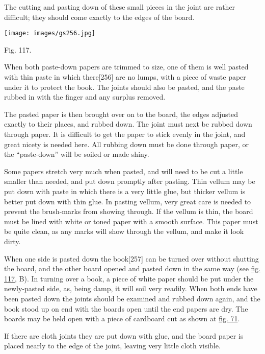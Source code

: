 \documentclass[
]{article}
\begin{document}
The cutting and pasting down of these small pieces in the joint are
rather difficult; they should come exactly to the edges of the board.

\protect\hypertarget{Fig_117}{}{}
\texttt{[image: images/gs256.jpg]}

Fig. 117.

When both paste-down papers are trimmed to size, one of them is well
pasted with thin paste in which
there{\protect\hypertarget{Page_256}{}{{[}256{]}}} are no lumps, with a
piece of waste paper under it to protect the book. The joints should
also be pasted, and the paste rubbed in with the finger and any surplus
removed.

The pasted paper is then brought over on to the board, the edges
adjusted exactly to their places, and rubbed down. The joint must next
be rubbed down through paper. It is difficult to get the paper to stick
evenly in the joint, and great nicety is needed here. All rubbing down
must be done through paper, or the ``paste-down'' will be soiled or made
shiny.

Some papers stretch very much when pasted, and will need to be cut a
little smaller than needed, and put down promptly after pasting. Thin
vellum may be put down with paste in which there is a very little glue,
but thicker vellum is better put down with thin glue. In pasting vellum,
very great care is needed to prevent the brush-marks from showing
through. If the vellum is thin, the board must be lined with white or
toned paper with a smooth surface. This paper must be quite clean, as
any marks will show through the vellum, and make it look dirty.

When one side is pasted down the
book{\protect\hypertarget{Page_257}{}{{[}257{]}}} can be turned over
without shutting the board, and the other board opened and pasted down
in the same way (see \protect\hyperlink{Fig_117}{fig. 117}, B). In
turning over a book, a piece of white paper should be put under the
newly-pasted side, as, being damp, it will soil very readily. When both
ends have been pasted down the joints should be examined and rubbed down
again, and the book stood up on end with the boards open until the end
papers are dry. The boards may be held open with a piece of cardboard
cut as shown at \protect\hyperlink{Fig_71}{fig. 71}.

If there are cloth joints they are put down with glue, and the board
paper is placed nearly to the edge of the joint, leaving very little
cloth visible.
\end{document}
